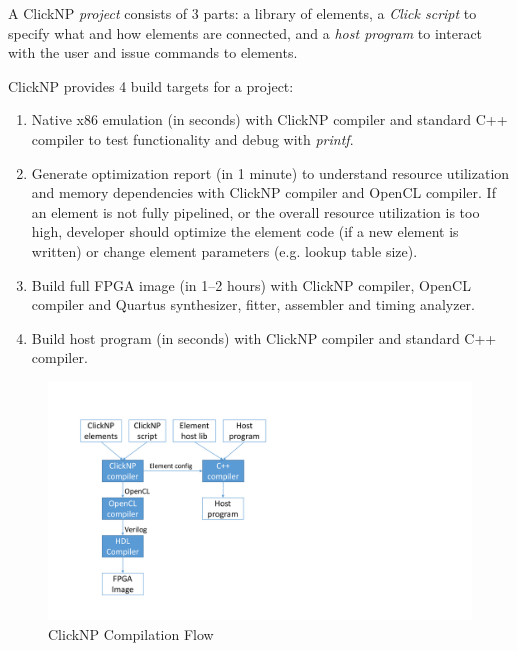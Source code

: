 {A ClickNP \textit{project} consists of 3 parts: a library of elements, a \textit{Click script} to specify what and how elements are connected, and a \textit{host program} to interact with the user and issue commands to elements.

ClickNP provides 4 build targets for a project:

\begin{enumerate}
	\item Native x86 emulation (in seconds) with ClickNP compiler and standard C++ compiler to test functionality and debug with \textit{printf}.
	\item Generate optimization report (in 1 minute) to understand resource utilization and memory dependencies with ClickNP compiler and OpenCL compiler. If an element is not fully pipelined, or the overall resource utilization is too high, developer should optimize the element code (if a new element is written) or change element parameters (e.g. lookup table size).
	\item Build full FPGA image (in 1--2 hours) with ClickNP compiler, OpenCL compiler and Quartus synthesizer, fitter, assembler and timing analyzer.
	\item Build host program (in seconds) with ClickNP compiler and standard C++ compiler.
\end{enumerate}


\begin{figure}[!t]
	\centering
	\includegraphics[width=0.8\columnwidth]{image/ClickNPSoftware}
	\vspace{-0.15in}
	\caption{ClickNP Compilation Flow}
	\vspace{-0.15in}
	\label{clicknp:fig:ClickNPSoftware}
\end{figure}

}
